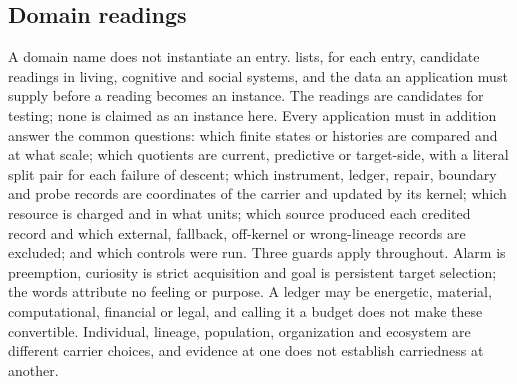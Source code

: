\subsection{Domain readings}\label{sec:scope-domains}

A domain name does not instantiate an entry.  lists, for each entry, candidate
readings in living, cognitive and social systems, and the data an application must supply before a
reading becomes an instance. The readings are candidates for testing; none is claimed as an
instance here. Every application must in addition answer the common questions: which finite
states or histories are compared and at what scale; which quotients are current, predictive or
target-side, with a literal split pair for each failure of descent; which instrument, ledger,
repair, boundary and probe records are coordinates of the carrier and updated by its kernel; which
resource is charged and in what units; which source produced each credited record and which
external, fallback, off-kernel or wrong-lineage records are excluded; and which controls were
run. Three guards apply throughout. Alarm is preemption, curiosity is strict acquisition and goal
is persistent target selection; the words attribute no feeling or purpose. A ledger may be
energetic, material, computational, financial or legal, and calling it a budget does not make these
convertible. Individual, lineage, population, organization and ecosystem are different carrier
choices, and evidence at one does not establish carriedness at another.

